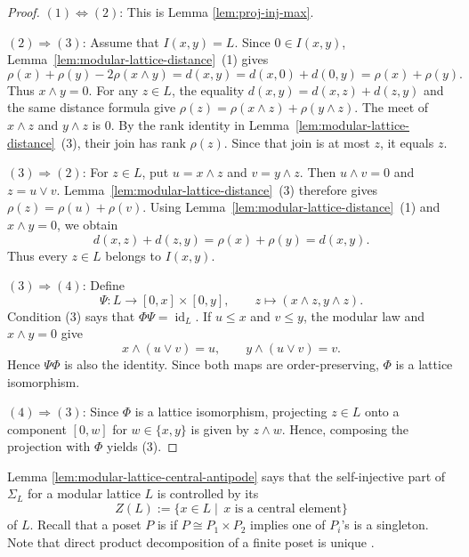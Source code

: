 \documentclass[a4paper,leqno]{amsart}
\begin{document}
\begin{proof}
$(1)\Leftrightarrow(2)$: This is Lemma \ref{lem:proj-inj-max}.

$(2)\Rightarrow(3)$: Assume that $I(x,y)=L$. Since $0\in I(x,y)$,
Lemma~\ref{lem:modular-lattice-distance}~(1) gives
\[
\rho(x)+\rho(y)-2\rho(x\wedge y)
=d(x,y)=d(x,0)+d(0,y)=\rho(x)+\rho(y).
\]
Thus $x\wedge y=0$. For any $z\in L$, the equality
$d(x,y)=d(x,z)+d(z,y)$ and the same distance formula give
$\rho(z)=\rho(x\wedge z)+\rho(y\wedge z)$. The meet of $x\wedge z$ and
$y\wedge z$ is $0$. By the rank identity in
Lemma~\ref{lem:modular-lattice-distance}~(3), their join has rank
$\rho(z)$. Since that join is at most $z$, it equals $z$.

$(3)\Rightarrow(2)$: For $z\in L$, put $u=x\wedge z$ and
$v=y\wedge z$. Then $u\wedge v=0$ and $z=u\vee v$.
Lemma~\ref{lem:modular-lattice-distance}~(3) therefore gives
$\rho(z)=\rho(u)+\rho(v)$. Using
Lemma~\ref{lem:modular-lattice-distance}~(1) and $x\wedge y=0$, we obtain
\[
d(x,z)+d(z,y)=\rho(x)+\rho(y)=d(x,y).
\]
Thus every $z\in L$ belongs to $I(x,y)$.

$(3)\Rightarrow(4)$: Define
\[
\Psi:L\longrightarrow[0,x]\times[0,y],
\qquad z\longmapsto(x\wedge z,y\wedge z).
\]
Condition (3) says that $\Phi\Psi=\operatorname{id}_L$. If $u\leq x$
and $v\leq y$, the modular law and $x\wedge y=0$ give
\[
x\wedge(u\vee v)=u,
\qquad
y\wedge(u\vee v)=v.
\]
Hence $\Psi\Phi$ is also the identity. Since both maps are
order-preserving, $\Phi$ is a lattice isomorphism.

$(4)\Rightarrow(3)$: Since $\Phi$ is a lattice isomorphism, projecting $z\in L$ onto a component $[0,w]$ for $w\in\{x,y\}$ is given by $z\wedge w$.  Hence, composing the projection with $\Phi$ yields (3).
\end{proof}

Lemma \ref{lem:modular-lattice-central-antipode} says that the self-injective part of $\Sigma_L$ for a modular lattice $L$ is controlled by its  
$$ Z(L):=\{ x \in L\mid \, x \text{ is a central element}\}$$
of $L$.  
Recall that a poset $P$ is  if $P\cong P_1\times P_2$ implies one of $P_i$'s is a singleton.  Note that direct product decomposition of a finite poset is unique \cite{Has51}.  
\end{document}
